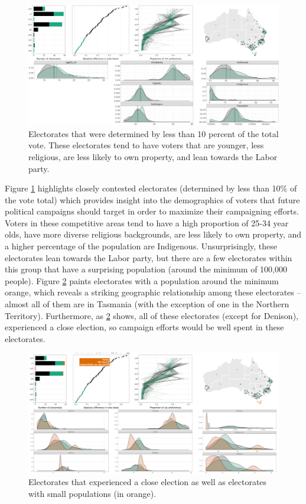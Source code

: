 \documentclass[12pt,]{article}
\theoremstyle{definition}
\theoremstyle{definition}
\theoremstyle{remark}
\begin{document}
\begin{figure}
\centering
\includegraphics{images/eechidna-diff.pdf}
\caption{\label{fig:eechidna-diff}Electorates that were determined by less
than 10 percent of the total vote. These electorates tend to have voters
that are younger, less religious, are less likely to own property, and
lean towards the Labor party.}
\end{figure}

Figure \ref{fig:eechidna-diff} highlights closely contested electorates
(determined by less than 10\% of the vote total) which provides insight
into the demographics of voters that future political campaigns should
target in order to maximize their campaigning efforts. Voters in these
competitive areas tend to have a high proportion of 25-34 year olds,
have more diverse religious backgrounds, are less likely to own
property, and a higher percentage of the population are Indigenous.
Unsurprisingly, these electorates lean towards the Labor party, but
there are a few electorates within this group that have a surprising
population (around the minimum of 100,000 people). Figure
\ref{fig:eechidna-diff2} paints electorates with a population around the
minimum orange, which reveals a striking geographic relationship among
these electorates -- almost all of them are in Tasmania (with the
exception of one in the Northern Territory). Furthermore, as
\ref{fig:eechidna-diff2} shows, all of these electorates (except for
Denison), experienced a close election, so campaign efforts would be
well spent in these electorates.

\begin{figure}
\centering
\includegraphics{images/eechidna-diff2.pdf}
\caption{\label{fig:eechidna-diff2}Electorates that experienced a close
election as well as electorates with small populations (in orange).}
\end{figure}
\end{document}
